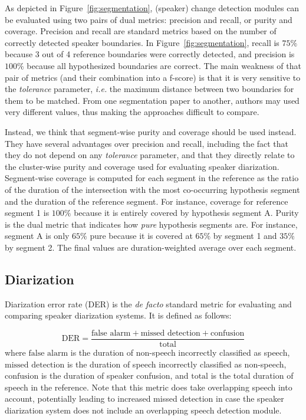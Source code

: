 \documentclass[a4paper]{article}
\begin{document}
As depicted in Figure~\ref{fig:segmentation}, (speaker) change detection modules can be evaluated using two pairs of dual metrics: precision and recall, or purity and coverage. Precision and recall are standard metrics based on the number of correctly detected speaker boundaries. In Figure~\ref{fig:segmentation}, recall is $75\%$ because 3 out of 4 reference boundaries were correctly detected, and precision is $100\%$ because all hypothesized boundaries are correct. The main weakness of that pair of metrics (and their combination into a f-score) is that it is very sensitive to the \emph{tolerance} parameter, \emph{i.e.} the maximum distance between two boundaries for them to be matched. From one segmentation paper to another, authors may used very different values, thus making the approaches difficult to compare.

Instead, we think that segment-wise purity and coverage should be used instead.
They have several advantages over precision and recall, including the fact that they do not depend on any \emph{tolerance} parameter, and that they directly relate to the cluster-wise purity and coverage used for evaluating speaker diarization.
Segment-wise coverage is computed for each segment in the reference as the ratio of the duration of the intersection with the most co-occurring hypothesis segment and the duration of the reference segment. For instance, coverage for reference segment 1 is $100\%$ because it is entirely covered by hypothesis segment A. Purity is the dual metric that indicates how \emph{pure} hypothesis segments are. For instance, segment A is only $65\%$ pure because it is covered at $65\%$ by segment 1 and $35\%$ by segment 2.
The final values are duration-weighted average over each segment.

\subsection{Diarization}

Diarization error rate (DER) is the \emph{de facto} standard metric for evaluating and comparing speaker diarization systems.
It is defined as follows:

\begin{equation*}
  \text{DER} = \frac{\text{false alarm} + \text{missed detection} + \text{confusion}}{\text{total}}
\end{equation*}
where $\text{false alarm}$ is the duration of non-speech incorrectly classified as speech, $\text{missed detection}$ is the duration of
speech incorrectly classified as non-speech, $\text{confusion}$ is the duration of speaker confusion, and $\text{total}$ is the total duration of speech in the reference.
Note that this metric does take overlapping speech into account, potentially leading to increased missed detection in case the speaker diarization system does not include an overlapping speech detection module.
\end{document}
